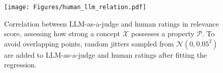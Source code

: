 \begin{figure}[t!]
\centering
\texttt{[image: Figures/human\_llm\_relation.pdf]}
\vspace{-1mm}
\caption{Correlation between LLM-as-a-judge and human ratings in relevance score, assessing how strong a concept \( \mathcal{X} \) possesses a property \( \mathcal{P} \). To avoid overlapping points, random jitters sampled from $\mathcal{N}(0, 0.05^2)$ are added to LLM-as-a-judge and human ratings after fitting the regression.}
\label{fig:human-llm-relation}
\vspace{-5mm}
\end{figure}